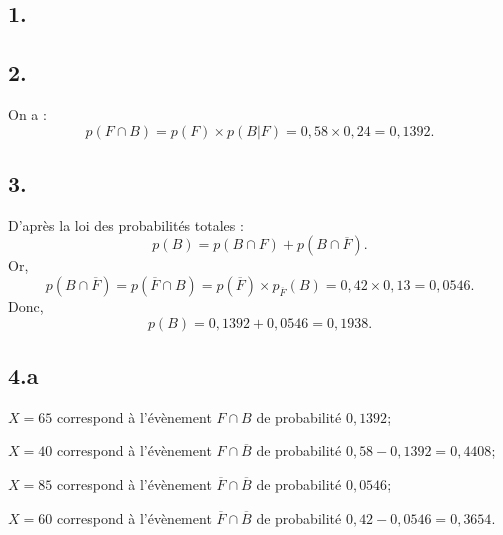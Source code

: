 \subsection*{1.}
	\begin{center}
	\end{center}
	
	\subsection*{2.}
	On a :
	\[
	p(F \cap B) = p(F) \times p(B|F) = 0,58 \times 0,24 = 0,1392.
	\]
	
	\subsection*{3.}
	D'après la loi des probabilités totales :
	\[
	p(B) = p(B \cap F) + p(B \cap \overline{F}).
	\]
	Or,
	\[
	p(B \cap \overline{F}) = p(\overline{F} \cap B) = p(\overline{F}) \times p_{\overline{F}}(B) = 0,42 \times 0,13 = 0,0546.
	\]
	Donc,
	\[
	p(B) = 0,1392 + 0,0546 = 0,1938.
	\]
	
	\subsection*{4.a}
	\(X = 65\) correspond à l'évènement \(F \cap B\) de probabilité \(0,1392\);
	
	\(X = 40\) correspond à l'évènement \(F \cap \overline{B}\) de probabilité \(0,58 - 0,1392 = 0,4408\);
	
	\(X = 85\) correspond à l'évènement \(\overline{F} \cap \overline{B}\) de probabilité \(0,0546\);
	
	\(X = 60\) correspond à l'évènement \(\overline{F} \cap \overline{B}\) de probabilité \(0,42 - 0,0546 = 0,3654\).
	
